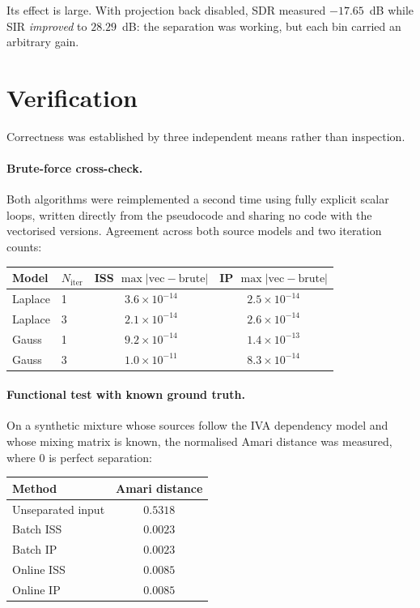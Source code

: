 \documentclass[11pt,a4paper]{article}
\begin{document}
Its effect is large. With projection back disabled, SDR measured
$-17.65$~dB while SIR \emph{improved} to $28.29$~dB: the separation was working,
but each bin carried an arbitrary gain.

\section{Verification}

Correctness was established by three independent means rather than inspection.

\paragraph{Brute-force cross-check.} Both algorithms were reimplemented a second
time using fully explicit scalar loops, written directly from the pseudocode and
sharing no code with the vectorised versions. Agreement across both source
models and two iteration counts:

\begin{table}[h]
\centering
\begin{tabular}{llcc}
\toprule
Model & $N_{\text{iter}}$ & ISS $\max|\text{vec}-\text{brute}|$ & IP $\max|\text{vec}-\text{brute}|$ \\
\midrule
Laplace & 1 & $3.6\times10^{-14}$ & $2.5\times10^{-14}$ \\
Laplace & 3 & $2.1\times10^{-14}$ & $2.6\times10^{-14}$ \\
Gauss   & 1 & $9.2\times10^{-14}$ & $1.4\times10^{-13}$ \\
Gauss   & 3 & $1.0\times10^{-11}$ & $8.3\times10^{-14}$ \\
\bottomrule
\end{tabular}
\end{table}

\paragraph{Functional test with known ground truth.} On a synthetic mixture whose
sources follow the IVA dependency model and whose mixing matrix is known, the
normalised Amari distance was measured, where $0$ is perfect separation:

\begin{table}[h]
\centering
\begin{tabular}{lc}
\toprule
Method & Amari distance \\
\midrule
Unseparated input & $0.5318$ \\
Batch ISS & $0.0023$ \\
Batch IP & $0.0023$ \\
Online ISS & $0.0085$ \\
Online IP & $0.0085$ \\
\bottomrule
\end{tabular}
\end{table}
\end{document}
